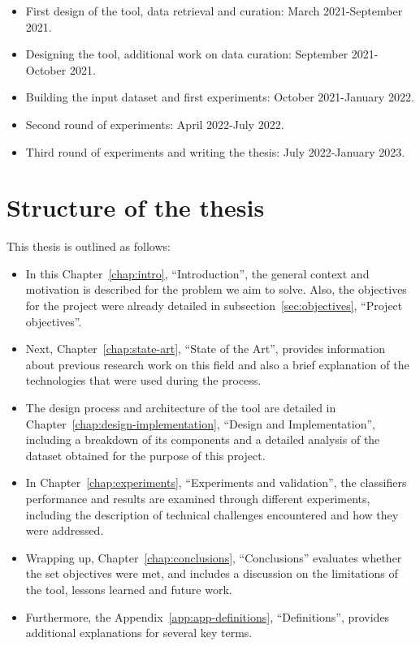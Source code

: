 \documentclass[a4paper, 12pt]{book}
\begin{document}
\begin{itemize}
\item First design of the tool, data retrieval and curation: March 2021-September 2021.
\item Designing the tool, additional work on data curation: September 2021-October 2021.
\item Building the input dataset and first experiments: October 2021-January 2022.
\item Second round of experiments: April 2022-July 2022.
\item Third round of experiments and writing the thesis: July 2022-January 2023.
\end{itemize}

\section{Structure of the thesis}
\label{sec:structure}

This thesis is outlined as follows:

\begin{itemize}
    \item In this Chapter~\ref{chap:intro}, ``Introduction'', the general context and motivation is described for the problem we aim to solve. Also, the objectives for the project were already detailed in subsection~\ref{sec:objectives}, ``Project objectives''. 
    \item Next, Chapter~\ref{chap:state-art}, ``State of the Art'',  provides information about previous research work on this field and also a brief explanation of the technologies that were used during the process.
    \item The design process and architecture of the tool are detailed in Chapter~\ref{chap:design-implementation}, ``Design and Implementation'', including a breakdown of its components and a detailed analysis of the dataset obtained for the purpose of this project.
    \item In Chapter~\ref{chap:experiments}, ``Experiments and validation'', the classifiers performance and results are examined through different experiments, including the description of technical challenges encountered and how they were addressed.
    \item Wrapping up, Chapter~\ref{chap:conclusions}, ``Conclusions'' evaluates whether the set objectives were met, and includes a discussion on the limitations of the tool, lessons learned and future work.
    \item Furthermore, the Appendix~\ref{app:app-definitions}, ``Definitions'', provides additional explanations for several key terms.
\end{itemize}
\end{document}
